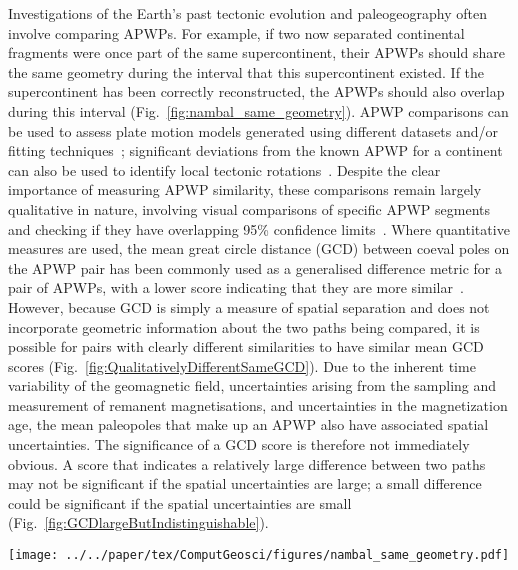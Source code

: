 Investigations of the Earth's past tectonic evolution and paleogeography often
involve comparing APWPs. For example, if two now separated continental fragments
were once part of the same supercontinent, their APWPs should share the same
geometry during the interval that this supercontinent existed. If the
supercontinent has been correctly reconstructed, the APWPs should also overlap
during this interval (Fig.~\ref{fig:nambal_same_geometry}). APWP comparisons can
be used to assess plate motion models generated using different datasets and/or
fitting techniques~\cite[for example]{B02,B07,S07,T08,D11}; significant
deviations from the known APWP for a continent can also be used to identify
local tectonic rotations~\cite[for example]{G10,Ch13}. Despite the clear
importance of measuring APWP similarity, these comparisons remain largely
qualitative in nature, involving visual comparisons of specific APWP segments
and checking if they have overlapping 95\% confidence limits~\cite[for
example]{B02,B07,G10,D11}. Where quantitative measures are used, the mean great
circle distance (GCD) between coeval poles on the APWP pair has been commonly
used as a generalised difference metric for a pair of APWPs, with a lower score
indicating that they are more similar~\cite[for example]{S07,T08}. However,
because GCD is simply a measure of spatial separation and does not incorporate
geometric information about the two paths being compared, it is possible for
pairs with clearly different similarities to have similar mean GCD scores
(Fig.~\ref{fig:QualitativelyDifferentSameGCD}). Due to the inherent time
variability of the geomagnetic field, uncertainties arising from the sampling
and measurement of remanent magnetisations, and uncertainties in the
magnetization age, the mean paleopoles that make up an APWP also have associated
spatial uncertainties. The significance of a GCD score is therefore not
immediately obvious. A score that indicates a relatively large difference
between two paths may not be significant if the spatial uncertainties are large;
a small difference could be significant if the spatial uncertainties are small
(Fig.~\ref{fig:GCDlargeButIndistinguishable}).


\begin{figure*}[tbp]
\centering
\texttt{[image: ../../paper/tex/ComputGeosci/figures/nambal\_same\_geometry.pdf]}
\caption[Parts of APWPs of supercontinent fragments share the same
geometry]{(a) The APWPs for North America (black) and Baltica (grey) are
spatially distinct, but their Late Paleozoic\textendash{}Early Mesozoic sections
are geometrically similar due to them both being part of the supercontinent
Pangaea. (b) Reversing the opening of the Atlantic Ocean by rotation around a
reconstruction pole (blue star) results in the overlap of these two APWPs
between 390 million years ago (Ma) and 220 Ma, validating the proposed
paleogeography. The effects of this rotation on Baltica and its APWP (BAL) are
illustrated by the motion of the circle marker (before: blank center; after:
dark center), respectively. General Perspective projection. APWPs and rotation
parameters from~\citet{To16}.}\label{fig:nambal_same_geometry}
\end{figure*}

